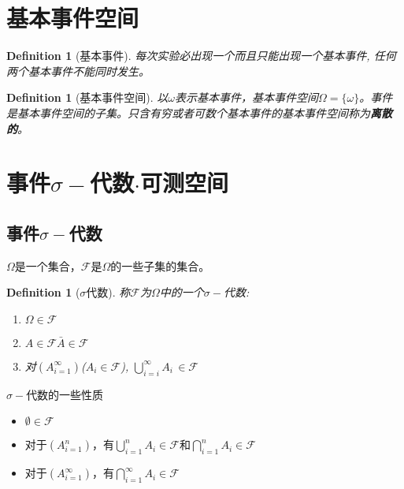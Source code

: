 \section{基本事件空间}
\newtheorem{basicevent}[theorem_root]{Definition}
\newtheorem{basiceventspace}[theorem_root]{Definition}

\begin{basicevent}[基本事件]
每次实验必出现一个而且只能出现一个基本事件, 任何两个基本事件不能同时发生。
\end{basicevent}

\begin{basiceventspace}[基本事件空间]
以$\omega$表示基本事件，基本事件空间$\Omega = \{\omega\}$。事件是基本事件空间的子集。只含有穷或者可数个基本事件的基本事件空间称为{\bf 离散的}。
\end{basiceventspace}

\section{事件$\sigma-$代数$\cdot$可测空间}
\newtheorem{sigmaalgebra}[theorem_root]{Definition}
\newtheorem{smallestsigmaalgebraset}[theorem_root]{Definition}

\subsection{事件$\sigma-$代数}

$\Omega$是一个集合，$\mathscr{F}$是$\Omega$的一些子集的集合。

\begin{sigmaalgebra}[$\sigma$代数]
    称$\mathscr{F}$为$\Omega$中的一个$\sigma-$代数:
    \begin{enumerate}
        \item $\Omega\in\mathscr{F}$
        \item $A\in\mathscr{F}$\equalwith${\bar A}\in\mathscr{F}$
        \item 对$(A_{i=1}^{\infty})$($A_i\in\mathscr{F}$), $\bigcup\limits_{i=i}^{\infty}A_i\,\in\mathscr{F}$
    \end{enumerate}
\end{sigmaalgebra}

\noindent$\sigma-$代数的一些性质
\begin{itemize}
    \item$\emptyset\in\mathscr{F}$
    \item 对于$(A_{i=1}^{n})$，有$\bigcup_{i=1}^nA_{i}\in\mathscr{F}$和$\bigcap_{i=1}^{n}A_i\in\mathscr{F}$
    \item 对于$(A_{i=1}^{\infty})$，有$\bigcap_{i=1}^{\infty}A_i\in\mathscr{F}$
\end{itemize}

